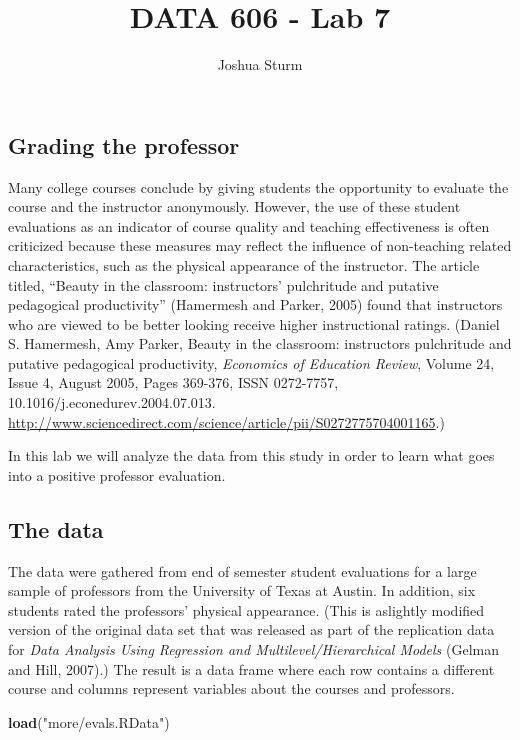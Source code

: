 \documentclass[]{article}
\title{DATA 606 - Lab 7}
\author{Joshua Sturm}
\date{}
\newenvironment{Shaded}{\begin{snugshade}}{\end{snugshade}}
\newcommand{\KeywordTok}[1]{\textcolor[rgb]{0.13,0.29,0.53}{\textbf{#1}}}
\newcommand{\StringTok}[1]{\textcolor[rgb]{0.31,0.60,0.02}{#1}}
\newcommand{\NormalTok}[1]{#1}
\begin{document}
\maketitle

\subsection{Grading the professor}\label{grading-the-professor}

Many college courses conclude by giving students the opportunity to
evaluate the course and the instructor anonymously. However, the use of
these student evaluations as an indicator of course quality and teaching
effectiveness is often criticized because these measures may reflect the
influence of non-teaching related characteristics, such as the physical
appearance of the instructor. The article titled, ``Beauty in the
classroom: instructors' pulchritude and putative pedagogical
productivity'' (Hamermesh and Parker, 2005) found that instructors who
are viewed to be better looking receive higher instructional ratings.
(Daniel S. Hamermesh, Amy Parker, Beauty in the classroom: instructors
pulchritude and putative pedagogical productivity, \emph{Economics of
Education Review}, Volume 24, Issue 4, August 2005, Pages 369-376, ISSN
0272-7757, 10.1016/j.econedurev.2004.07.013.
\url{http://www.sciencedirect.com/science/article/pii/S0272775704001165}.)

In this lab we will analyze the data from this study in order to learn
what goes into a positive professor evaluation.

\subsection{The data}\label{the-data}

The data were gathered from end of semester student evaluations for a
large sample of professors from the University of Texas at Austin. In
addition, six students rated the professors' physical appearance. (This
is aslightly modified version of the original data set that was released
as part of the replication data for \emph{Data Analysis Using Regression
and Multilevel/Hierarchical Models} (Gelman and Hill, 2007).) The result
is a data frame where each row contains a different course and columns
represent variables about the courses and professors.

\begin{Shaded}
\begin{Highlighting}[]
\KeywordTok{load}\NormalTok{(}\StringTok{"more/evals.RData"}\NormalTok{)}
\end{Highlighting}
\end{Shaded}
\end{document}
